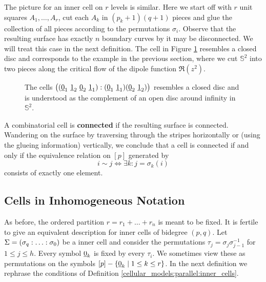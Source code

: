 The picture for an inner cell on $r$ levels is similar.
Here we start off with $r$ unit squares $A_1, \ldots, A_r$, cut each $A_k$ in $(p_k+1)(q+1)$ pieces and glue the collection of all pieces according to the permutations $\sigma_i$.
Observe that the resulting surface has exactly $n$ boundary curves by it may be disconnected.
We will treat this case in the next definition.
The cell in Figure \ref{cellular_models:parallel:closed_disc} resembles a closed disc and corresponds to the example in the previous section, where we cut $\mathbb S^2$ into two pieces along the critical flow of the dipole function $\Re(z^2)$.
\begin{figure}[ht]
\centering
{}
\caption{\label{cellular_models:parallel:closed_disc}The cells $\big((\underline{\smash{0}}_1\ \underline{\smash{1}}_2\ \underline{\smash{0}}_2\ \underline{\smash{1}}_1): (\underline{\smash{0}}_1\ \underline{\smash{1}}_1)(\underline{\smash{0}}_2\ \underline{\smash{1}}_2)\big)$ resembles a closed disc and is understood as the complement of an open disc around infinity in $\mathbb S^2$.}
\end{figure}

\begin{defi}
    \label{cellular_models:parallel:connected}
    A combinatorial cell is {\bf connected} if the resulting surface is connected.
    Wandering on the surface by traversing through the stripes horizontally or (using the glueing information) vertically, we conclude that a cell is connected if and only if the equivalence relation on $[p]$ generated by
    \[
        i \sim j \iff \exists k : j = \sigma_k(i)
    \]
    consists of exactly one element.
\end{defi}

\subsection{Cells in Inhomogeneous Notation}
\label{cellular_models:parallel:cells_in_inhomogenous_notation}
As before, the ordered partition $r = r_1 + \ldots + r_n$ is meant to be fixed.
It is fertile to give an equivalent description for inner cells of bidegree $(p,q)$.
Let $\Sigma = \homogq$ be a inner cell and consider the permutations $\tau_j = \sigma_j \sigma_{j-1}^{-1}$ for $1 \le j \le h$.
Every symbol $\underline{\smash{0}}_k$ is fixed by every $\tau_i$.
We sometimes view these as permutations on the symbols $[p] - \{ \underline{\smash{0}}_k \mid 1 \le k \le r\}$.
In the next definition we rephrase the conditions of Definition \ref{cellular_models:parallel:inner_cells}.

